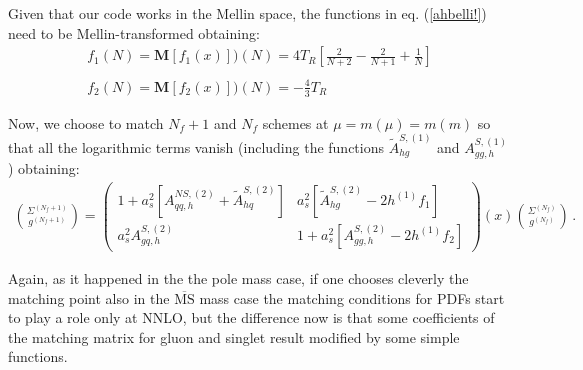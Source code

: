 \documentclass[10pt,a4paper]{article}
\begin{document}
Given that our code works in the Mellin space, the functions in eq. (\ref{ahbelli!}) need to be Mellin-transformed obtaining:
\begin{equation}
\begin{array}{l}
\displaystyle f_1(N) = \mathbf{M}[f_1(x)])(N)= 4 T_R\left[\frac2{N+2}-\frac2{N+1}+\frac1N\right]\\
\\
\displaystyle f_2(N) = \mathbf{M}[f_2(x)])(N)= -\frac43 T_R
\end{array}
\label{ahbellissimi!}
\end{equation}

Now, we choose to match $N_f+1$ and $N_f$ schemes at $\mu = m(\mu) = m(m)$ so that all the logarithmic terms vanish (including the functions $\tilde{A}^{S,(1)}_{hg}$ and $A_{gg,h}^{S,(1)}$) obtaining:
\begin{equation}
\begin{array}{c}
\displaystyle {\Sigma^{(N_f+1)}\choose g^{(N_f+1)}}=\begin{pmatrix}1+a_s^2[A_{qq,h}^{N\!S,(2)}+\tilde{A}^{S,(2)}_{hq}] & a_s^2[\tilde{A}^{S,(2)}_{hg}-2h^{(1)}f_1]\\
a_s^2A^{S,(2)}_{gq,h} & 1+a_s^2[A_{gg,h}^{S,(2)}-2h^{(1)}f_2]\end{pmatrix}(x){\Sigma^{(N_f)} \choose g^{(N_f)}}\,.
\end{array}
\end{equation}

Again, as it happened in the the pole mass case, if one chooses
cleverly the matching point also in the $\overline{\mbox{MS}}$ mass
case the matching conditions for PDFs start to play a role only at
NNLO, but the difference now is that some coefficients of the matching
matrix for gluon and singlet result modified by some simple functions.
\end{document}
